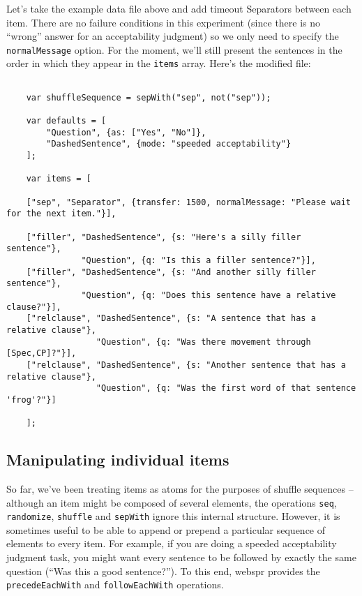 \documentclass[11pt,letterpaper]{article}
\begin{document}
Let's take the example data file above and add timeout Separators between each
item. There are no failure conditions in this experiment (since there is no
``wrong'' answer for an acceptability judgment) so we only need to specify the
\texttt{normalMessage} option. For the moment, we'll still present the sentences in
the order in which they appear in the \texttt{items} array. Here's the modified file:
\footnotesize\begin{verbatim}

    var shuffleSequence = sepWith("sep", not("sep"));

    var defaults = [
        "Question", {as: ["Yes", "No"]},
        "DashedSentence", {mode: "speeded acceptability"}
    ];

    var items = [

    ["sep", "Separator", {transfer: 1500, normalMessage: "Please wait for the next item."}],

    ["filler", "DashedSentence", {s: "Here's a silly filler sentence"},
               "Question", {q: "Is this a filler sentence?"}],
    ["filler", "DashedSentence", {s: "And another silly filler sentence"},
               "Question", {q: "Does this sentence have a relative clause?"}],
    ["relclause", "DashedSentence", {s: "A sentence that has a relative clause"},
                  "Question", {q: "Was there movement through [Spec,CP]?"}],
    ["relclause", "DashedSentence", {s: "Another sentence that has a relative clause"},
                  "Question", {q: "Was the first word of that sentence 'frog'?"}]

    ];
\end{verbatim}

\smallskip\noindent\normalsize


\subsection{Manipulating individual items}

So far, we've been treating items as atoms for the purposes of shuffle
sequences -- although an item might be composed of several elements, the
operations \texttt{seq}, \texttt{randomize}, \texttt{shuffle} and \texttt{sepWith} ignore this internal structure.
However, it is sometimes useful to be able to append or prepend a particular
sequence of elements to every item.  For example, if you are doing a speeded
acceptability judgment task, you might want every sentence to be followed by
exactly the same question (``Was this a good sentence?''). To this end, webspr
provides the \texttt{precedeEachWith} and \texttt{followEachWith} operations.
\end{document}
